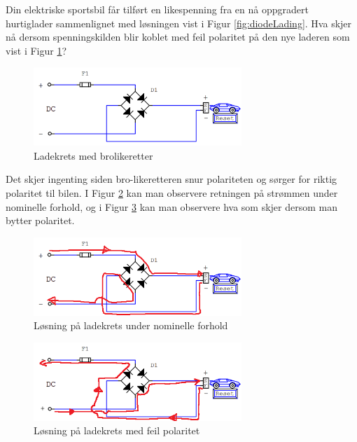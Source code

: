 \begin{question}[name=Oppgave, topic=dioder]
	Din elektriske sportsbil får tilført en likespenning fra en nå oppgradert hurtiglader sammenlignet med løsningen vist i Figur \ref{fig:diodeLading}. Hva skjer nå dersom spenningskilden blir koblet med feil polaritet på den nye laderen som vist i Figur \ref{fig:diodeLadingG}?
	
	\begin{figure}[H]
		\centering
		\includegraphics[width=0.7\textwidth]{diode/figurer/GretzLading.png}
		\caption{Ladekrets med brolikeretter}
		\label{fig:diodeLadingG}
	\end{figure}
	
\end{question}

\vspace{0.5cm} %

\begin{solution}[name=Løsningsforslag oppgave]
Det skjer ingenting siden bro-likeretteren snur polariteten og sørger for riktig polaritet til bilen. I Figur \ref{fig:BroLadingSol} kan man observere retningen på strømmen under nominelle forhold, og i Figur \ref{fig:BroLadingSol2} kan man observere hva som skjer dersom man bytter polaritet.

\begin{figure}[H]
	\centering
	\includegraphics[width=0.7\textwidth]{diode/figurer/GretzLadingVanlig-SOL.png}
	\caption{Løsning på ladekrets under nominelle forhold}
	\label{fig:BroLadingSol}
\end{figure}
	
\begin{figure}[H]
	\centering
	\includegraphics[width=0.7\textwidth]{diode/figurer/GretzLadingFeil-SOL.png}
	\caption{Løsning på ladekrets med feil polaritet}
	\label{fig:BroLadingSol2}
\end{figure}	
	
	
\end{solution}





